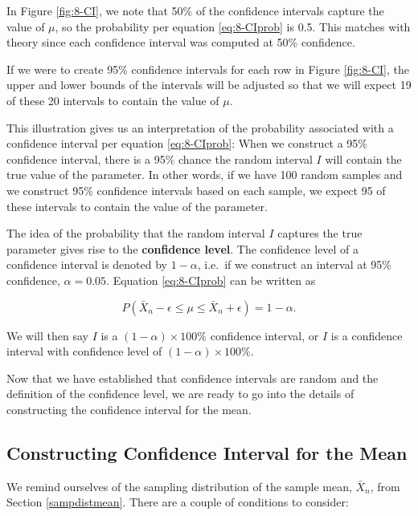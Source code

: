 \documentclass[
]{book}
\begin{document}
In Figure \ref{fig:8-CI}, we note that 50\% of the confidence intervals capture the value of \(\mu\), so the probability per equation \eqref{eq:8-CIprob} is 0.5. This matches with theory since each confidence interval was computed at 50\% confidence.

If we were to create 95\% confidence intervals for each row in Figure \ref{fig:8-CI}, the upper and lower bounds of the intervals will be adjusted so that we will expect 19 of these 20 intervals to contain the value of \(\mu\).

This illustration gives us an interpretation of the probability associated with a confidence interval per equation \eqref{eq:8-CIprob}: When we construct a 95\% confidence interval, there is a 95\% chance the random interval \(I\) will contain the true value of the parameter. In other words, if we have 100 random samples and we construct 95\% confidence intervals based on each sample, we expect 95 of these intervals to contain the value of the parameter.

The idea of the probability that the random interval \(I\) captures the true parameter gives rise to the \textbf{confidence level}. The confidence level of a confidence interval is denoted by \(1-\alpha\), i.e.~if we construct an interval at 95\% confidence, \(\alpha=0.05\). Equation \eqref{eq:8-CIprob} can be written as

\begin{equation} 
P(\bar{X}_n - \epsilon \leq \mu \leq \bar{X}_n + \epsilon) = 1 - \alpha.
\label{eq:8-CIalpha}
\end{equation}

We will then say \(I\) is a \((1-\alpha) \times 100\%\) confidence interval, or \(I\) is a confidence interval with confidence level of \((1-\alpha) \times 100\%\).

Now that we have established that confidence intervals are random and the definition of the confidence level, we are ready to go into the details of constructing the confidence interval for the mean.

\subsection{Constructing Confidence Interval for the Mean}\label{constructing-confidence-interval-for-the-mean}

We remind ourselves of the sampling distribution of the sample mean, \(\bar{X}_n\), from Section \ref{sampdistmean}. There are a couple of conditions to consider:
\end{document}
